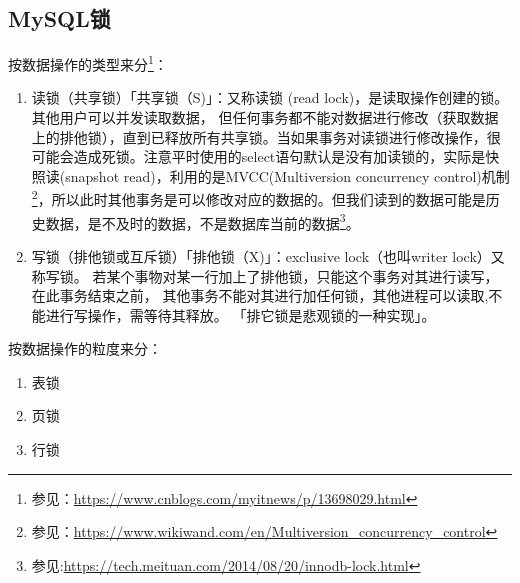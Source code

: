 \documentclass[../../../interview-questions.tex]{subfiles}
\begin{document}
\subsection{MySQL锁}

按数据操作的类型来分\footnote{参见：\url{https://www.cnblogs.com/myitnews/p/13698029.html}}：

\begin{enumerate}
    \item{读锁（共享锁）}「共享锁（S)」：又称读锁 (read lock)，是读取操作创建的锁。其他用户可以并发读取数据， 但任何事务都不能对数据进行修改（获取数据上的排他锁），直到已释放所有共享锁。当如果事务对读锁进行修改操作，很可能会造成死锁。注意平时使用的select语句默认是没有加读锁的，实际是快照读(snapshot read)，利用的是MVCC(Multiversion concurrency control)机制\footnote{参见：\url{https://www.wikiwand.com/en/Multiversion_concurrency_control}}，所以此时其他事务是可以修改对应的数据的。但我们读到的数据可能是历史数据，是不及时的数据，不是数据库当前的数据\footnote{参见:\url{https://tech.meituan.com/2014/08/20/innodb-lock.html}}。
    \item{写锁（排他锁或互斥锁）}「排他锁（X)」：exclusive lock（也叫writer lock）又称写锁。 若某个事物对某一行加上了排他锁，只能这个事务对其进行读写，在此事务结束之前， 其他事务不能对其进行加任何锁，其他进程可以读取,不能进行写操作，需等待其释放。 「排它锁是悲观锁的一种实现」。
\end{enumerate}

按数据操作的粒度来分：

\begin{enumerate}
    \item{表锁}
    \item{页锁}
    \item{行锁}
\end{enumerate}
\end{document}
